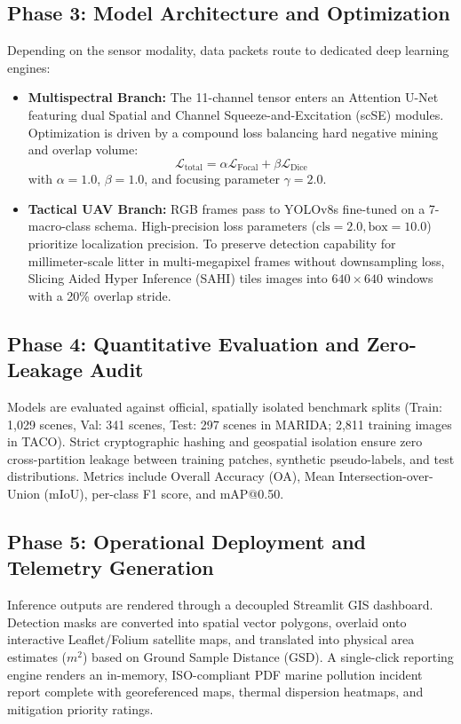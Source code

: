 \documentclass[conference]{IEEEtran}
\begin{document}
\subsection{Phase 3: Model Architecture and Optimization}
Depending on the sensor modality, data packets route to dedicated deep learning engines:
\begin{itemize}
    \item \textbf{Multispectral Branch:} The 11-channel tensor enters an Attention U-Net featuring dual Spatial and Channel Squeeze-and-Excitation (scSE) modules. Optimization is driven by a compound loss balancing hard negative mining and overlap volume:
    \begin{equation}
        \mathcal{L}_{\text{total}} = \alpha \mathcal{L}_{\text{Focal}} + \beta \mathcal{L}_{\text{Dice}}
    \end{equation}
    with $\alpha = 1.0$, $\beta = 1.0$, and focusing parameter $\gamma = 2.0$.
    \item \textbf{Tactical UAV Branch:} RGB frames pass to YOLOv8s fine-tuned on a 7-macro-class schema. High-precision loss parameters ($\text{cls}=2.0, \text{box}=10.0$) prioritize localization precision. To preserve detection capability for millimeter-scale litter in multi-megapixel frames without downsampling loss, Slicing Aided Hyper Inference (SAHI) tiles images into $640 \times 640$ windows with a 20\% overlap stride.
\end{itemize}

\subsection{Phase 4: Quantitative Evaluation and Zero-Leakage Audit}
Models are evaluated against official, spatially isolated benchmark splits (Train: 1,029 scenes, Val: 341 scenes, Test: 297 scenes in MARIDA; 2,811 training images in TACO). Strict cryptographic hashing and geospatial isolation ensure zero cross-partition leakage between training patches, synthetic pseudo-labels, and test distributions. Metrics include Overall Accuracy (OA), Mean Intersection-over-Union (mIoU), per-class F1 score, and mAP@0.50.

\subsection{Phase 5: Operational Deployment and Telemetry Generation}
Inference outputs are rendered through a decoupled Streamlit GIS dashboard. Detection masks are converted into spatial vector polygons, overlaid onto interactive Leaflet/Folium satellite maps, and translated into physical area estimates ($m^2$) based on Ground Sample Distance (GSD). A single-click reporting engine renders an in-memory, ISO-compliant PDF marine pollution incident report complete with georeferenced maps, thermal dispersion heatmaps, and mitigation priority ratings.
\end{document}

